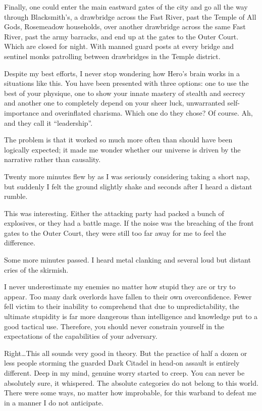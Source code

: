 Finally, one could enter the main eastward gates of the city and go all the way through Blacksmith’s, a drawbridge across the Fast River, past the Temple of All Gods, Rosemeadow households, over another drawbridge across the same Fast River, past the army barracks, and end up at the gates to the Outer Court. Which are closed for night. With manned guard posts at every bridge and sentinel monks patrolling between drawbridges in the Temple district.

Despite my best efforts, I never stop wondering how Hero’s brain works in a situations like this. You have been presented with three options: one to use the best of your physique, one to show your innate mastery of stealth and secrecy and another one to completely depend on your sheer luck, unwarranted self-importance and overinflated charisma. Which one do they chose? Of course. Ah, and they call it “leadership”.

The problem is that it worked so much more often than should have been logically expected; it made me wonder whether our universe is driven by the narrative rather than causality.

Twenty more minutes flew by as I was seriously considering taking a short nap, but suddenly I felt the ground slightly shake and seconds after I heard a distant rumble.

This was interesting. Either the attacking party had packed a bunch of explosives, or they had a battle mage. If the noise was the breaching of the front gates to the Outer Court, they were still too far away for me to feel the difference.

Some more minutes passed. I heard metal clanking and several loud but distant cries of the skirmish.

I never underestimate my enemies no matter how stupid they are or try to appear. Too many dark overlords have fallen to their own overconfidence. Fewer fell victim to their inability to comprehend that due to unpredictability, the ultimate stupidity is far more dangerous than intelligence and knowledge put to a good tactical use. Therefore, you should never constrain yourself in the expectations of the capabilities of your adversary.

Right\dots This all sounds very good in theory. But the practice of half a dozen or less people storming the guarded Dark Citadel in head-on assault is entirely different. Deep in my mind, genuine worry started to creep. You can never be absolutely sure, it whispered. The absolute categories do not belong to this world. There were some ways, no matter how improbable, for this warband to defeat me in a manner I do not anticipate.

